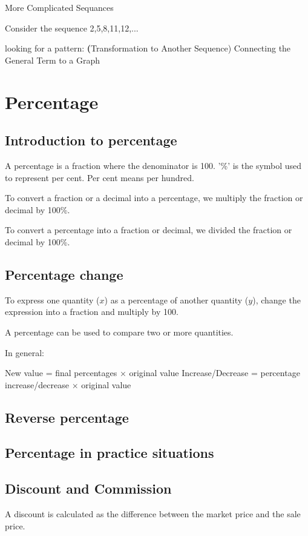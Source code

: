 \documentclass[../main]{subfiles}
\begin{document}
More Complicated Sequances

Consider the sequence 2,5,8,11,12,...

looking for a pattern:
\textbf(Transformation to Another Sequence)
Connecting the General Term to a Graph


\section{Percentage}
\subsection{Introduction to percentage}
A percentage is a fraction where the denominator is 100. '\%' is the symbol used
to represent per cent. Per cent means per hundred.

To convert a fraction or a decimal into a percentage, we multiply the fraction
or decimal by 100\%.

To convert a percentage into a fraction or decimal, we divided the fraction or
decimal by 100\%.

\subsection{Percentage change}

To express one quantity ($x$) as a percentage of another quantity ($y$), change
the expression into a fraction and multiply by 100.

A percentage can be used to compare two or more quantities.

In general:

New value = final percentages $\times$ original value
Increase/Decrease = percentage increase/decrease $\times$ original value



\subsection{Reverse percentage}
\subsection{Percentage in practice situations}

\subsection{Discount and Commission}
A discount is calculated as the difference between the market price and the sale
price.
\end{document}
